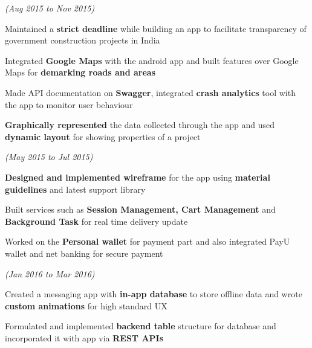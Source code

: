 \documentclass[a4paper]{deedy-resume} %
\begin{document}
\hfill {\textit{\small(Aug 2015 to Nov 2015)}}\


\begin{tightitemize}
\item Maintained a  \textbf{strict deadline} while building an app to facilitate transparency of government construction projects in India
\item Integrated \textbf{Google Maps} with the android app and built features over Google Maps for \textbf{demarking roads and areas}
\item Made API documentation on \textbf{Swagger}, integrated \textbf{crash analytics} tool with the app to monitor user behaviour
\item \textbf{Graphically represented} the data collected through the app and used \textbf{dynamic layout} for showing properties of a project
\end{tightitemize}
\microspace





\hfill {\textit{\small(May 2015 to Jul 2015)}}\\
\begin{tightitemize}
\item \textbf{Designed  and implemented wireframe} for the app using \textbf{material guidelines} and latest support library
\item Built services such as \textbf{Session Management, Cart Management} and \textbf{Background Task} for real time delivery update
\item Worked on the \textbf{Personal wallet} for payment part and also integrated PayU wallet and net banking for secure payment 
\end{tightitemize}


\microspace %
\hfill {\textit{\small(Jan 2016 to Mar 2016)}}\\
\begin{tightitemize}
\item Created a messaging app with  \textbf{in-app database} to store offline data and wrote  \textbf{custom animations} for high standard UX
\item Formulated and implemented  \textbf{backend table} structure for database and incorporated it with app via  \textbf{REST APIs}
\end{tightitemize}
\end{document}
